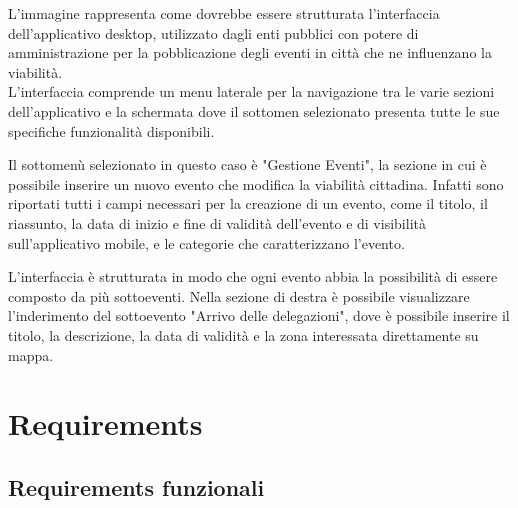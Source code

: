 \documentclass{article}
\begin{document}
L'immagine rappresenta come dovrebbe essere strutturata l'interfaccia dell'applicativo desktop, utilizzato dagli enti pubblici con potere di amministrazione per la pobblicazione degli eventi in città che ne influenzano la viabilità.\\
L'interfaccia comprende un menu laterale per la navigazione tra le varie sezioni dell'applicativo e la schermata dove il sottomen selezionato presenta tutte le sue specifiche funzionalità disponibili.

Il sottomenù selezionato in questo caso è "Gestione Eventi", la sezione in cui è possibile inserire un nuovo evento che modifica la viabilità cittadina. Infatti sono riportati tutti i campi necessari per la creazione di un evento, come il titolo, il riassunto, la data di inizio e fine di validità dell'evento e di visibilità sull'applicativo mobile, e le categorie che caratterizzano l'evento.

L'interfaccia è strutturata in modo che ogni evento abbia la possibilità di essere composto da più sottoeventi. Nella sezione di destra è possibile visualizzare l'inderimento del sottoevento "Arrivo delle delegazioni", dove è possibile inserire il titolo, la descrizione, la data di validità e la zona interessata direttamente su mappa.\\

\clearpage

\section{Requirements}

\subsection{Requirements funzionali}
\end{document}
